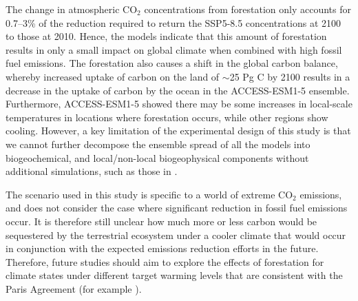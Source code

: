 \documentclass[]{article}
\begin{document}
The change in atmospheric CO$_2$ concentrations from forestation only accounts for 0.7--3\% of the reduction required to return the SSP5-8.5 concentrations at 2100 to those at 2010.
Hence, the models indicate that this amount of forestation results in only a small impact on global climate when combined with high fossil fuel emissions.
The forestation also causes a shift in the global carbon balance, whereby increased uptake of carbon on the land of $\sim$25 Pg C by 2100 results in a decrease in the uptake of carbon by the ocean in the ACCESS-ESM1-5 ensemble.
Furthermore, ACCESS-ESM1-5 showed there may be some increases in local-scale temperatures in locations where forestation occurs, while other regions show cooling.
However, a key limitation of the experimental design of this study is that we cannot further decompose the ensemble spread of all the models into biogeochemical, and local/non-local biogeophysical components without additional simulations, such as those in \cite{winckler_nonlocal_2019}.

The scenario used in this study is specific to a world of extreme CO$_2$ emissions, and does not consider the case where significant reduction in fossil fuel emissions occur.
It is therefore still unclear how much more or less carbon would be sequestered by the terrestrial ecosystem under a cooler climate that would occur in conjunction with the expected emissions reduction efforts in the future.
Therefore, future studies should aim to explore the effects of forestation for climate states under different target warming levels that are consistent with the Paris Agreement  (for example \cite{king_studying_2021}).
\end{document}
